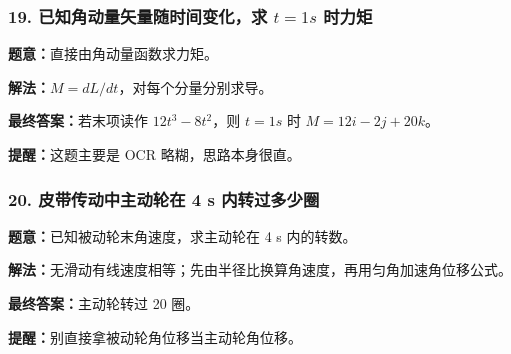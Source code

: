 \documentclass[12pt,a4paper]{ctexart}
\begin{document}
\subsubsection*{19. 已知角动量矢量随时间变化，求 \(t=1 s\) 时力矩}
\begin{tcolorbox}[colback=gray!2!white,colframe=black!60,title={题目}]
\textbf{题意：}直接由角动量函数求力矩。\par
\end{tcolorbox}
\begin{tcolorbox}[colback=blue!2!white,colframe=blue!55!black,title={完整答案}]
\textbf{解法：}\(M=dL/dt\)，对每个分量分别求导。\par
\textbf{最终答案：}若末项读作 \(12t^3-8t^2\)，则 \(t=1 s\) 时 \(M=12i-2j+20k\)。\par

\end{tcolorbox}
\begin{tcolorbox}[colback=red!2!white,colframe=red!55!black,title={易错点}]
\textbf{提醒：}这题主要是 OCR 略糊，思路本身很直。\par
\end{tcolorbox}

\subsubsection*{20. 皮带传动中主动轮在 4 s 内转过多少圈}
\begin{tcolorbox}[colback=gray!2!white,colframe=black!60,title={题目}]
\textbf{题意：}已知被动轮末角速度，求主动轮在 4 s 内的转数。\par
\end{tcolorbox}
\begin{tcolorbox}[colback=blue!2!white,colframe=blue!55!black,title={完整答案}]
\textbf{解法：}无滑动有线速度相等；先由半径比换算角速度，再用匀角加速角位移公式。\par
\textbf{最终答案：}主动轮转过 20 圈。\par

\end{tcolorbox}
\begin{tcolorbox}[colback=red!2!white,colframe=red!55!black,title={易错点}]
\textbf{提醒：}别直接拿被动轮角位移当主动轮角位移。\par
\end{tcolorbox}
\end{document}
